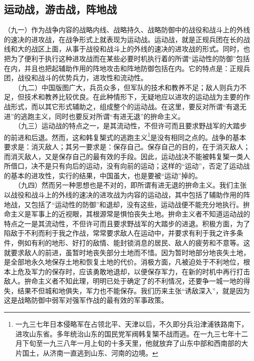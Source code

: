 \documentclass[cn,11pt,chinese]{elegantbook}
\def\myformat#1{\hfil\hfil #1}
\begin{document}
\subsection*{\myformat{运动战，游击战，阵地战}}
（九一）作为战争内容的战略内线、战略持久、战略防御中的战役和战斗上的外线的速决的进攻战，在战争形式上就表现为运动战。运动战，就是正规兵团在长的战线和大的战区上面，从事于战役和战斗上的外线的速决的进攻战的形式。同时，也把为了便利于执行这种进攻战而在某些必要时机执行着的所谓“运动性的防御”包括在内，并且也把起辅助作用的阵地攻击和阵地防御包括在内。它的特点是：正规兵团，战役和战斗的优势兵力，进攻性和流动性。\\
　　（九二）中国版图广大，兵员众多，但军队的技术和教养不足；敌人则兵力不足，但技术和教养比较优良。在此种情形下，无疑地应以进攻的运动战为主要的作战形式，而以其它形式辅助之，组成整个的运动战。在这里，要反对所谓“有退无进”的逃跑主义，同时也要反对所谓“有进无退”的拚命主义。\\
　　（九三）运动战的特点之一，是其流动性，不但许可而且要求野战军的大踏步的前进和后退。然而，这和韩复榘式的逃跑主义\footnote[39]{ 一九三七年日本侵略军在占领北平、天津以后，不久即分兵沿津浦铁路南下，进攻山东省。多年统治山东的国民党军阀韩复榘不战而逃。在一九三七年十二月下旬至一九三八年一月上旬的十多天里，他就放弃了山东中部和西南部的大片国土，从济南一直逃到山东、河南的边境。}是没有相同之点的。战争的基本要求是：消灭敌人；其另一要求是：保存自己。保存自己的目的，在于消灭敌人；而消灭敌人，又是保存自己的最有效的手段。因此，运动战决不能被韩复榘一类人所借口，决不是只有向后的运动，没有向前的运动；这样的“运动”，否定了运动战的基本的进攻性，实行的结果，中国虽大，也是要被“运动”掉的。\\
　　（九四）然而另一种思想也是不对的，即所谓有进无退的拚命主义。我们主张以战役和战斗上的外线的速决的进攻战为内容的运动战，其中包括了辅助作用的阵地战，又包括了“运动性的防御”和退却，没有这些，运动战便不能充分地执行。拚命主义是军事上的近视眼，其根源常是惧怕丧失土地。拚命主义者不知道运动战的特点之一是其流动性，不但许可而且要求野战军的大踏步的进退。积极方面，为了陷敌于不利而利于我之作战，常常要求敌人在运动中，并要求有利于我之许多条件，例如有利的地形、好打的敌情、能封锁消息的居民、敌人的疲劳和不意等。这就要求敌人的前进，虽暂时地丧失部分土地而不惜。因为暂时地部分地丧失土地，是全部地永久地保存土地和恢复土地的代价。消极方面，凡被迫处于不利地位，根本上危及军力的保存时，应该勇敢地退却，以便保存军力，在新的时机中再行打击敌人。拚命主义者不知此理，明明已处于确定了的不利情况，还要争一城一地的得失，结果不但城和地俱失，军力也不能保存。我们历来主张“诱敌深入”，就是因为这是战略防御中弱军对强军作战的最有效的军事政策。\\
\end{document}
